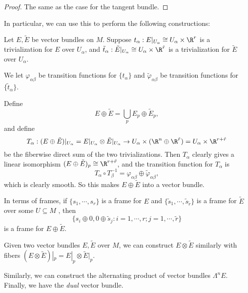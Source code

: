 \documentclass[a4paper]{article}
\begin{document}
\begin{proof}
  The same as the case for the tangent bundle.
\end{proof}

In particular, we can use this to perform the following constructions:
\begin{defi}
  Let $E, \tilde{E}$ be vector bundles on $M$. Suppose $t_\alpha: E|_{U_\alpha} \cong U_\alpha \times \R^r$ is a trivialization for $E$ over $U_\alpha$, and $\tilde{t}_\alpha: \tilde{E}|_{U_\alpha} \cong U_\alpha \times \R^{\tilde{r}}$ is a trivialization for $\tilde{E}$ over $U_\alpha$.

  We let $\varphi_{\alpha\beta}$ be transition functions for $\{t_\alpha\}$ and $\tilde{\varphi}_{\alpha\beta}$ be transition functions for $\{\tilde{t}_\alpha\}$.

  Define
  \[
    E \oplus \tilde{E} = \bigcup_p E_p \oplus \tilde{E}_p,
  \]
  and define
  \[
    T_\alpha: (E \oplus \tilde{E})|_{U_\alpha} = E|_{U_\alpha} \otimes \tilde{E}|_{U_\alpha} \to U_\alpha \times (\R^n \oplus \R^{\tilde{r}}) = U_\alpha \times \R^{r + \tilde{r}}
  \]
  be the fiberwise direct sum of the two trivializations. Then $T_\alpha$ clearly gives a linear isomorphism $(E \oplus \tilde{E})_p \cong \R^{r + \tilde{r}}$, and the transition function for $T_\alpha$ is
  \[
    T_\alpha \circ T_\beta^{-1} = \varphi_{\alpha\beta} \oplus \tilde{\varphi}_{\alpha\beta},
  \]
  which is clearly smooth. So this makes $E \oplus \tilde{E}$ into a vector bundle.
\end{defi}

In terms of frames, if $\{s_1, \cdots, s_r\}$ is a frame for $E$ and $\{\tilde{s}_1, \cdots, \tilde{s}_{\tilde{r}}\}$ is a frame for $\tilde{E}$ over some $U\subseteq M$ , then
\[
  \{s_i \oplus 0, 0 \oplus \tilde{s}_j: i = 1, \cdots, r; j = 1, \cdots, \tilde{r}\}
\]
is a frame for $E \oplus \tilde{E}$.

\begin{defi}
  Given two vector bundles $E, \tilde{E}$ over $M$, we can construct $E \otimes \tilde{E}$ similarly with fibers $(E \otimes \tilde{E})|_p = E|_p \otimes \tilde{E}|_p$.
\end{defi}

Similarly, we can construct the alternating product of vector bundles $\Lambda^n E$. Finally, we have the \emph{dual} vector bundle.
\end{document}
